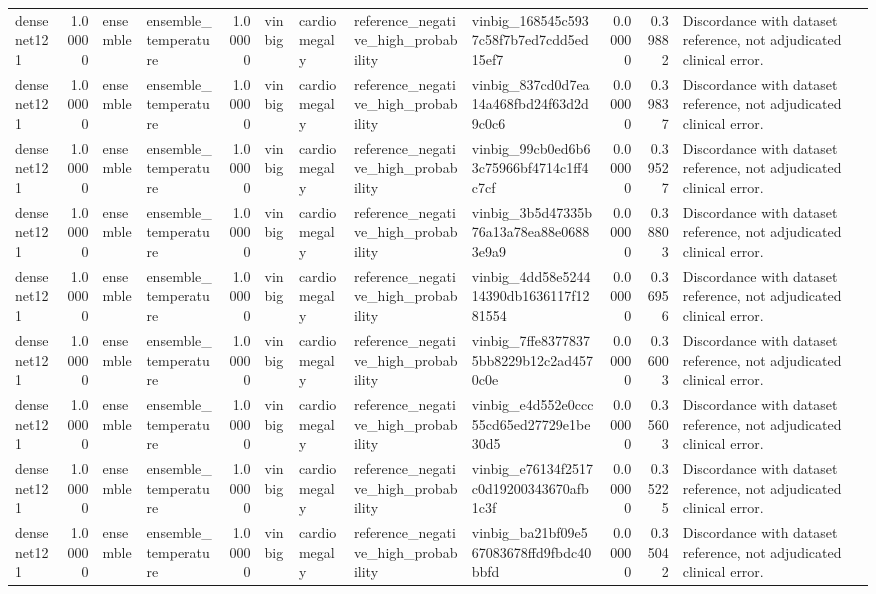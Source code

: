 \begin{tabular}{lrllrllllrrl}
densenet121 & 1.00000 & ensemble & ensemble\_temperature & 1.00000 & vinbig & cardiomegaly & reference\_negative\_high\_probability & vinbig\_168545c5937c58f7b7ed7cdd5ed15ef7 & 0.00000 & 0.39882 & Discordance with dataset reference, not adjudicated clinical error. \\
densenet121 & 1.00000 & ensemble & ensemble\_temperature & 1.00000 & vinbig & cardiomegaly & reference\_negative\_high\_probability & vinbig\_837cd0d7ea14a468fbd24f63d2d9c0c6 & 0.00000 & 0.39837 & Discordance with dataset reference, not adjudicated clinical error. \\
densenet121 & 1.00000 & ensemble & ensemble\_temperature & 1.00000 & vinbig & cardiomegaly & reference\_negative\_high\_probability & vinbig\_99cb0ed6b63c75966bf4714c1ff4c7cf & 0.00000 & 0.39527 & Discordance with dataset reference, not adjudicated clinical error. \\
densenet121 & 1.00000 & ensemble & ensemble\_temperature & 1.00000 & vinbig & cardiomegaly & reference\_negative\_high\_probability & vinbig\_3b5d47335b76a13a78ea88e06883e9a9 & 0.00000 & 0.38803 & Discordance with dataset reference, not adjudicated clinical error. \\
densenet121 & 1.00000 & ensemble & ensemble\_temperature & 1.00000 & vinbig & cardiomegaly & reference\_negative\_high\_probability & vinbig\_4dd58e524414390db1636117f1281554 & 0.00000 & 0.36956 & Discordance with dataset reference, not adjudicated clinical error. \\
densenet121 & 1.00000 & ensemble & ensemble\_temperature & 1.00000 & vinbig & cardiomegaly & reference\_negative\_high\_probability & vinbig\_7ffe83778375bb8229b12c2ad4570c0e & 0.00000 & 0.36003 & Discordance with dataset reference, not adjudicated clinical error. \\
densenet121 & 1.00000 & ensemble & ensemble\_temperature & 1.00000 & vinbig & cardiomegaly & reference\_negative\_high\_probability & vinbig\_e4d552e0ccc55cd65ed27729e1be30d5 & 0.00000 & 0.35603 & Discordance with dataset reference, not adjudicated clinical error. \\
densenet121 & 1.00000 & ensemble & ensemble\_temperature & 1.00000 & vinbig & cardiomegaly & reference\_negative\_high\_probability & vinbig\_e76134f2517c0d19200343670afb1c3f & 0.00000 & 0.35225 & Discordance with dataset reference, not adjudicated clinical error. \\
densenet121 & 1.00000 & ensemble & ensemble\_temperature & 1.00000 & vinbig & cardiomegaly & reference\_negative\_high\_probability & vinbig\_ba21bf09e567083678ffd9fbdc40bbfd & 0.00000 & 0.35042 & Discordance with dataset reference, not adjudicated clinical error. \\

\end{tabular}
